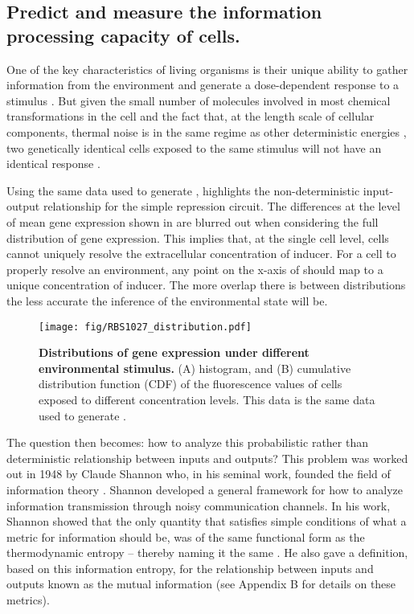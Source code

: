 \subsection{Predict and measure the information processing capacity of cells.}

One of the key characteristics of living organisms is their unique ability to
gather information from the environment and generate a dose-dependent response
to a stimulus \cite{Nemenman2010}. But given the small number of molecules
involved in most chemical transformations in the cell and the fact that, at the
length scale of cellular components, thermal noise is in the same regime as
other deterministic energies \cite{Phillips2006}, two genetically identical
cells exposed to the same stimulus will not have an identical response
\cite{Eldar2010}.

Using the same data used to generate , 
highlights the non-deterministic input-output relationship for the simple
repression circuit. The differences at the level of mean gene expression shown
in  are blurred out when considering the full distribution of gene
expression. This implies that, at the single cell level, cells cannot uniquely
resolve the extracellular concentration of inducer. For a cell to properly
resolve an environment, any point on the x-axis of  should
map to a unique concentration of inducer. The more overlap there is between
distributions the less accurate the inference of the environmental state will
be.

\begin{figure}[h!]
	\centering \texttt{[image: fig/RBS1027\_distribution.pdf]}
	\caption{{\bf Distributions of gene expression under different environmental
	stimulus.} (A) histogram, and (B) cumulative distribution function (CDF) of
	the fluorescence values of cells exposed to different concentration levels.
	This data is the same data used to generate .}
  \label{fig:gene_dist}
\end{figure}

The question then becomes: how to analyze this probabilistic rather than
deterministic relationship between inputs and outputs? This problem was worked
out in 1948 by Claude Shannon who, in his seminal work, founded the field of
information theory \cite{Shannon1948}. Shannon developed a general framework for
how to analyze information transmission through noisy communication channels. In
his work, Shannon showed that the only quantity that satisfies simple
conditions of what a metric for information should be, was of the same
functional form as the thermodynamic entropy -- thereby naming it the same
\cite{MacKay2003}. He also gave a definition, based on this information entropy,
for the relationship between inputs and outputs known as the mutual information
(see Appendix B for details on these metrics).

